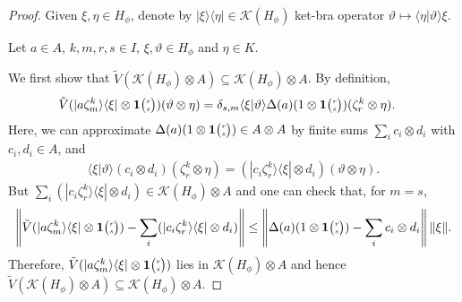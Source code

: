  \begin{proof}
   Given $\xi,\eta\in H_{\phi}$, denote by $|\xi\rangle\langle \eta| \in \mathcal{K}(H_{\phi})$ ket-bra   operator $\vartheta \mapsto \langle \eta|\vartheta\rangle \xi$. 

   Let $a\in A$, $k,m,r,s\in I$, $\xi,\vartheta \in H_{\phi}$ and   $\eta\in K$. 
   
   We first show that $\tilde V(\mathcal{K}(H_{\phi})\otimes A) \subseteq
   \mathcal{K}(H_{\phi}) \otimes A$. By definition,
\begin{align*}
     \tilde V(|a\zeta^{k}_{m}\rangle\langle \xi| \otimes \mathbf{1}{\tiny {\begin{pmatrix} r\\s\end{pmatrix}}})(\vartheta \otimes \eta) 
     &=     \delta_{s,m} \langle \xi|\vartheta\rangle \Delta(a)(1 \otimes \mathbf{1}{\tiny {\begin{pmatrix} r\\s\end{pmatrix}}})(\zeta^{k}_{r}
     \otimes \eta).
   \end{align*} 
   Here, we can approximate $\Delta(a)(1\otimes \mathbf{1}{\tiny {\begin{pmatrix} r\\s\end{pmatrix}}}) \in A\otimes A$ by finite sums $\sum_{i} c_{i} \otimes
   d_{i}$ with $c_{i},d_{i} \in A$, and
   \begin{align*}
 \langle \xi|\vartheta\rangle (c_{i} \otimes
d_{i})(\zeta^{k}_{r} \otimes \eta) = 
 (|c_{i}\zeta^{k}_{r}\rangle\langle \xi| \otimes d_{i}) (\vartheta \otimes \eta).
   \end{align*}
  But  $\sum_{i} (|c_{i}\zeta^{k}_{r}\rangle\langle \xi| \otimes d_{i}) \in \mathcal{K}(H_{\phi}) \otimes
A$  and  one can check that, %
for $m=s$, 
   \begin{align*}
     \left\|\tilde V(|a\zeta^{k}_{m}\rangle\langle \xi| \otimes \mathbf{1}{\tiny {\begin{pmatrix} r\\s\end{pmatrix}}}) -      \sum_{i}
       (|c_{i}\zeta^{k}_{r}\rangle\langle \xi| \otimes d_{i})\right\| \leq
     \left\|\Delta(a)(1\otimes \mathbf{1}{\tiny {\begin{pmatrix} r\\s\end{pmatrix}}}) -  \sum_{i} c_{i} \otimes
   d_{i}\right\| \|\xi\|.
   \end{align*}
   Therefore, $\tilde V(|a\zeta^{k}_{m}\rangle\langle \xi| \otimes \mathbf{1}{\tiny {\begin{pmatrix} r\\s\end{pmatrix}}})$ lies in   $\mathcal{K}(H_{\phi}) \otimes A$ and hence $\tilde V(\mathcal{K}(H_{\phi})\otimes A) \subseteq
   \mathcal{K}(H_{\phi}) \otimes A$.
   


\end{proof}
